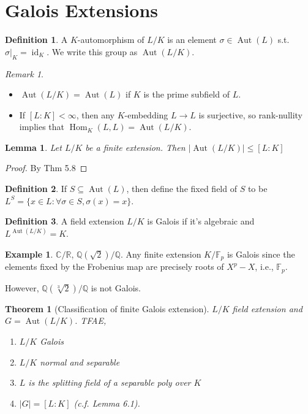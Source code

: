 \documentclass{article}
\theoremstyle{definition}
\newtheorem*{defn*}{Definition}
\newtheorem{example}[defn]{Example}
\theoremstyle{remark}
\newtheorem{rem}{Remark}
\theoremstyle{plain}
\newtheorem{lem}[defn]{Lemma}
\newtheorem{thm}[defn]{Theorem}
\newcommand{\QQ}{\mathbb{Q}}
\newcommand{\RR}{\mathbb{R}}
\newcommand{\CC}{\mathbb{C}}
\newcommand{\FF}{\mathbb{F}}
\newcommand{\Hom}{\operatorname{Hom}}
\newcommand{\Aut}{\operatorname{Aut}}
\begin{document}
\section{Galois Extensions}
\begin{defn*}
    A $K$-automorphism of $L/K$ is an element $\sigma\in\Aut(L)$ s.t. $\sigma|_K=\operatorname{id}_K$. We write this group as $\Aut(L/K)$.
\end{defn*}
\begin{rem}
    \begin{itemize}
        \item $\Aut(L/K)=\Aut(L)$ if $K$ is the prime subfield of $L$.
        \item If $[L:K]<\infty$, then any $K$-embedding $L\to L$ is surjective, so rank-nullity implies that $\Hom_K(L,L)=\Aut(L/K)$.
    \end{itemize}
\end{rem}
\begin{lem}
    Let $L/K$ be a finite extension. Then $|\Aut(L/K)|\le [L:K]$
\end{lem}
\begin{proof}
    By Thm 5.8
\end{proof}
\begin{defn*}
    If $S\subseteq\Aut(L)$, then define the fixed field of $S$ to be $L^S=\{x\in L:\forall\sigma\in S,\sigma(x)=x\}$.
\end{defn*}
\begin{defn*}
    A field extension $L/K$ is Galois if it's algebraic and $L^{\Aut(L/K)}=K$.
\end{defn*}
\begin{example}
    $\CC/\RR$, $\QQ(\sqrt{2})/\QQ$. Any finite extension $K/\FF_p$ is Galois since the elements fixed by the Frobenius map are precisely roots of $X^p-X$, i.e., $\FF_p$.

    However, $\QQ(\sqrt[3]{2})/\QQ$ is not Galois.
\end{example}
\begin{thm}[Classification of finite Galois extension]
    $L/K$ field extension and $G=\Aut(L/K)$. TFAE,
    \begin{enumerate}
        \item $L/K$ Galois
        \item $L/K$ normal and separable
        \item $L$ is the splitting field of a separable poly over $K$
        \item $|G|=[L:K]$ (c.f. Lemma 6.1).
    \end{enumerate}
\end{thm}
\end{document}
